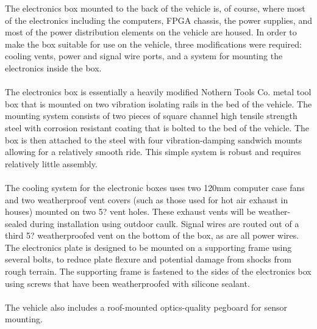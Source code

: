 The electronics box mounted to the back of the vehicle is, of course, where most of the electronics including the computers, FPGA chassis, the power supplies, and most of the power distribution elements on the vehicle are housed. In order to make the box suitable for use on the vehicle, three modifications were required: cooling vents, power and signal wire ports, and a system for mounting the electronics inside the box. \\ \\
%
\noindent The electronics box is essentially a heavily modified Nothern Tools Co. metal tool box that is mounted on two vibration isolating rails in the bed of the vehicle. The mounting system consists of two pieces of square channel high tensile strength steel with corrosion resistant coating that is bolted to the bed of the vehicle. The box is then attached to the steel with four vibration-damping sandwich mounts allowing for a relatively smooth ride. This simple system is robust and requires relatively little assembly. \\ \\
%
\noindent The cooling system for the electronic boxes uses two 120mm computer case fans and two weatherproof vent covers (such as those used for hot air exhaust in houses) mounted on two 5? vent holes. These exhaust vents will be weather-sealed during installation using outdoor caulk. Signal wires are routed out of a third 5? weatherproofed vent on the bottom of the box, as are all power wires. The electronics plate is designed to be mounted on a supporting frame using several bolts, to reduce plate flexure and potential damage from shocks from rough terrain. The supporting frame is fastened to the sides of the electronics box using screws that have been weatherproofed with silicone sealant.\\ \\
%
\noindent The vehicle also includes a roof-mounted optics-quality pegboard for sensor mounting. 